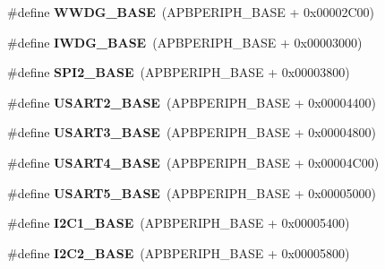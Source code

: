 \begin{DoxyCompactItemize}
\#define {\bfseries W\+W\+D\+G\+\_\+\+B\+A\+SE}~(A\+P\+B\+P\+E\+R\+I\+P\+H\+\_\+\+B\+A\+SE + 0x00002\+C00)
\item 
\mbox{\label{group___peripheral__memory__map_ga8543ee4997296af5536b007cd4748f55}} 
\#define {\bfseries I\+W\+D\+G\+\_\+\+B\+A\+SE}~(A\+P\+B\+P\+E\+R\+I\+P\+H\+\_\+\+B\+A\+SE + 0x00003000)
\item 
\mbox{\label{group___peripheral__memory__map_gac3e357b4c25106ed375fb1affab6bb86}} 
\#define {\bfseries S\+P\+I2\+\_\+\+B\+A\+SE}~(A\+P\+B\+P\+E\+R\+I\+P\+H\+\_\+\+B\+A\+SE + 0x00003800)
\item 
\mbox{\label{group___peripheral__memory__map_gade83162a04bca0b15b39018a8e8ec090}} 
\#define {\bfseries U\+S\+A\+R\+T2\+\_\+\+B\+A\+SE}~(A\+P\+B\+P\+E\+R\+I\+P\+H\+\_\+\+B\+A\+SE + 0x00004400)
\item 
\mbox{\label{group___peripheral__memory__map_gabe0d6539ac0026d598274ee7f45b0251}} 
\#define {\bfseries U\+S\+A\+R\+T3\+\_\+\+B\+A\+SE}~(A\+P\+B\+P\+E\+R\+I\+P\+H\+\_\+\+B\+A\+SE + 0x00004800)
\item 
\mbox{\label{group___peripheral__memory__map_gafa384bb1e7d610a806f7c1f1dbc72ac5}} 
\#define {\bfseries U\+S\+A\+R\+T4\+\_\+\+B\+A\+SE}~(A\+P\+B\+P\+E\+R\+I\+P\+H\+\_\+\+B\+A\+SE + 0x00004\+C00)
\item 
\mbox{\label{group___peripheral__memory__map_gab34de0b56d40b6895b53bb60ced2574f}} 
\#define {\bfseries U\+S\+A\+R\+T5\+\_\+\+B\+A\+SE}~(A\+P\+B\+P\+E\+R\+I\+P\+H\+\_\+\+B\+A\+SE + 0x00005000)
\item 
\mbox{\label{group___peripheral__memory__map_gacd72dbffb1738ca87c838545c4eb85a3}} 
\#define {\bfseries I2\+C1\+\_\+\+B\+A\+SE}~(A\+P\+B\+P\+E\+R\+I\+P\+H\+\_\+\+B\+A\+SE + 0x00005400)
\item 
\mbox{\label{group___peripheral__memory__map_ga04bda70f25c795fb79f163b633ad4a5d}} 
\#define {\bfseries I2\+C2\+\_\+\+B\+A\+SE}~(A\+P\+B\+P\+E\+R\+I\+P\+H\+\_\+\+B\+A\+SE + 0x00005800)

\end{DoxyCompactItemize}

